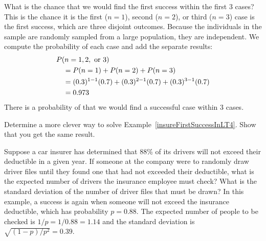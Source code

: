 \begin{examplewrap}
\begin{nexample}{What is the chance that we would find
    the first success within the first 3 cases?}
  \label{insureFirstSuccessInLT4}%
  This is the chance it is the first ($n=1$), second ($n=2$),
  or third ($n=3$) case is the first success, which are three
  disjoint outcomes.
  Because the individuals in the sample are randomly sampled
  from a large population, they are independent.
  We compute the probability of each case and add the separate
  results:
  \begin{align*}
  &P(n=1, 2, \text{ or }3) \\
    & \quad = P(n=1)+P(n=2)+P(n=3) \\
    & \quad = (0.3{})^{1-1}(0.7{})
        + (0.3{})^{2-1}(0.7{})
        + (0.3{})^{3-1}(0.7{}) \\
    & \quad = 0.973{}
  \end{align*}
  There is a probability of \insureCDistC{} that we would
  find a successful case within 3 cases.
\end{nexample}
\end{examplewrap}

\begin{exercisewrap}
\begin{nexercise}
Determine a more clever way to solve Example~\ref{insureFirstSuccessInLT4}.
Show that you get the same result.\footnotemark{}
\end{nexercise}
\end{exercisewrap}

\D{\newpage}

\begin{examplewrap}
\begin{nexample}{Suppose a car insurer has determined
    that 88\% of its drivers will not exceed their deductible
    in a given year.
    If someone at the company were to randomly draw
    driver files until they found one that had not exceeded
    their deductible, what is the expected number of drivers
    the insurance employee must check?
    What is the standard deviation of the number of driver files
    that must be drawn?}
  \label{carInsure08DrawOne}%
  In this example, a success is again when someone will not
  exceed the insurance deductible, which has probability
  $p = 0.88$.
  The expected number of people to be checked is
  $1 / p = 1 / 0.88 = 1.14$ and the standard deviation is
  $\sqrt{(1-p)/p^2} = 0.39$.
\end{nexample}
\end{examplewrap}

